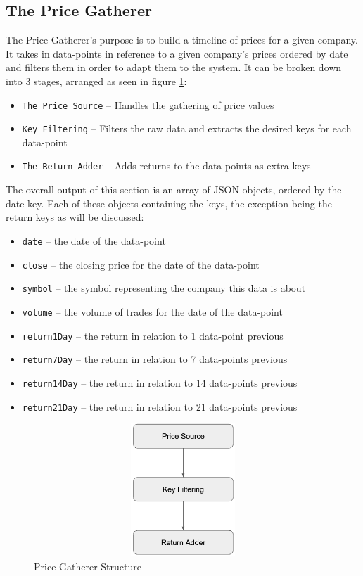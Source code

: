 \subsection{The Price Gatherer}

The Price Gatherer's purpose is to build a timeline of prices for a given company. It takes in data-points in reference to a given company's prices ordered by date and filters them in order to adapt them to the system. It can be broken down into 3 stages, arranged as seen in figure \ref{fig:pricegathererstructure}:
\begin{itemize}
    \item \texttt{The Price Source} -- Handles the gathering of price values
    \item \texttt{Key Filtering} -- Filters the raw data and extracts the desired keys for each data-point
    \item \texttt{The Return Adder} -- Adds returns to the data-points as extra keys
\end{itemize}

The overall output of this section is an array of JSON objects, ordered by the date key. Each of these objects containing the keys, the exception being the return keys as will be discussed:
\begin{itemize}
    \item \texttt{date} -- the date of the data-point
    \item \texttt{close} -- the closing price for the date of the data-point
    \item \texttt{symbol} -- the symbol representing the company this data is about
    \item \texttt{volume} -- the volume of trades for the date of the data-point
    \item \texttt{return1Day} -- the return in relation to 1 data-point previous
    \item \texttt{return7Day} -- the return in relation to 7 data-points previous
    \item \texttt{return14Day} -- the return in relation to 14 data-points previous
    \item \texttt{return21Day} -- the return in relation to 21 data-points previous
\end{itemize}

\begin{figure}[h]
    \centering
    \includegraphics[width=15cm,height=5cm,keepaspectratio]{design/PriceGathererStructure.png}
    \caption{Price Gatherer Structure}
    \label{fig:pricegathererstructure}
\end{figure}

